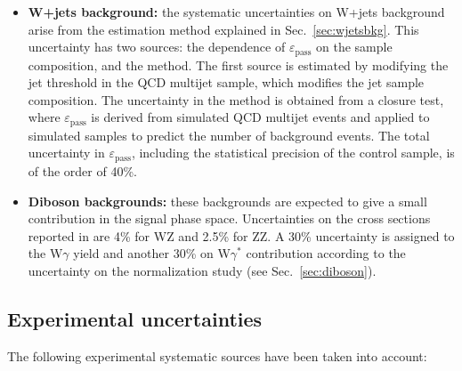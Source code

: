 \begin{itemize}
\item {\bf\boldmath W+jets background:} 
the systematic uncertainties on W+jets background arise from the estimation method explained in Sec.~\ref{sec:wjetsbkg}. This uncertainty has two sources: the dependence of $\varepsilon_\mathrm{pass}$ on the sample composition, and the method. The first source is estimated by modifying the jet \pt threshold in the QCD multijet sample, which modifies the jet sample composition.  The uncertainty in the method is obtained from a closure test, where $\varepsilon_\mathrm{pass}$ is derived from simulated QCD multijet events and applied to simulated samples to predict the number of background events. The total uncertainty in $\varepsilon_\mathrm{pass}$, including the statistical precision of the control sample, is of the order of 40\%.
 
\item {\bf\boldmath Diboson backgrounds:} 
these backgrounds are expected to give a small contribution in the signal phase space. Uncertainties on the cross sections reported in \cite{xsecSM,bib:ellis} are 4\% for WZ and 2.5\% for ZZ. A 30\% uncertainty is assigned to the W$\gamma$ \cite{WgammaXsec} yield and another 30\% on W$\gamma^{*}$ contribution according to the uncertainty on the normalization study (see Sec.~\ref{sec:diboson}).
      
\end{itemize}

\subsection{Experimental uncertainties \label{subsec:expsyst}}

The following experimental systematic sources have been taken into account:

